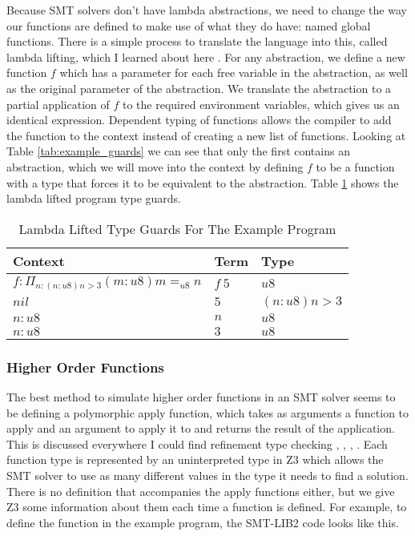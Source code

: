 Because SMT solvers don't have lambda abstractions, we need to change the way our functions are defined
to make use of what they do have: named global functions.
There is a simple process to translate the language into this, called lambda lifting, which I learned
about here \cite{barbosaROTB19}.
For any abstraction, we define a new function $f$ which has a parameter for each free variable in the
abstraction, as well as the original parameter of the abstraction.
We translate the abstraction to a partial application of $f$ to the required environment variables,
which gives us an identical expression.
Dependent typing of functions allows the compiler to add the function to the context instead of
creating a new list of functions.
Looking at Table \ref{tab:example_guards} we can see that only the first contains an abstraction,
which we will move into the context by defining $f$ to be a function with a type that forces it to
be equivalent to the abstraction.
Table \ref{tab:example_lambda_lifted} shows the lambda lifted program type guards.

\begin{table}
    \centering
    \begin{tabular}{|l|l|l|}
        \hline
        \textbf{Context} & \textbf{Term} & \textbf{Type}\\\hline
        $f: \Pi_{n: (n:u8) n > 3} (m: u8) m =_{u8} n$ & $f\ 5$ & $u8$\\\hline
        $nil$ & $5$ & $(n: u8) n > 3$\\\hline
        $n: u8$ & $n$ & $u8$\\\hline
        $n: u8$ & $3$ & $u8$\\\hline
    \end{tabular}
    \caption{Lambda Lifted Type Guards For The Example Program}
    \label{tab:example_lambda_lifted}
\end{table}

\subsubsection{Higher Order Functions}

The best method to simulate higher order functions in an SMT solver seems to be defining a polymorphic
apply function, which takes as arguments a function to apply and an argument to apply it to and returns
the result of the application.
This is discussed everywhere I could find refinement type checking
\cite{aguirre16}, \cite{barbosaROTB19}, \cite{mengP08}, \cite{blanchetteBP13}.
Each function type is represented by an uninterpreted type in Z3 which allows the SMT solver to use as
many different values in the type it needs to find a solution.
There is no definition that accompanies the apply functions either, but we give Z3 some information
about them each time a function is defined.
For example, to define the function in the example program, the SMT-LIB2 code looks like this.

